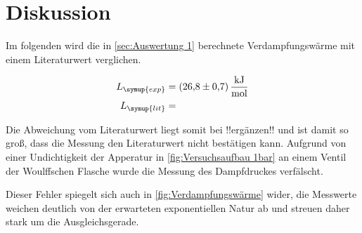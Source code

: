 \section{Diskussion}
\label{sec:Diskussion}

Im folgenden wird die in \autoref{sec:Auswertung 1} berechnete Verdampfungswärme mit einem Literaturwert verglichen.

\begin{align}
    L_{\symup{exp}}&=\qty{26,8+-0,7}{\kilo\joule\per\mol} \notag \\ 
    L_{\symup{lit}}&= \notag
\end{align}

Die Abweichung vom Literaturwert liegt somit bei !!ergänzen!! und ist damit so groß, dass die Messung den
Literaturwert nicht bestätigen kann.
Aufgrund von einer Undichtigkeit der Apperatur in \autoref{fig:Versuchsaufbau 1bar} an einem Ventil
der Woulffschen Flasche wurde die Messung des Dampfdruckes verfälscht.

Dieser Fehler spiegelt sich auch in \autoref{fig:Verdampfungswärme} wider, die Messwerte weichen deutlich
von der erwarteten exponentiellen Natur ab und streuen daher stark um die Ausgleichsgerade.